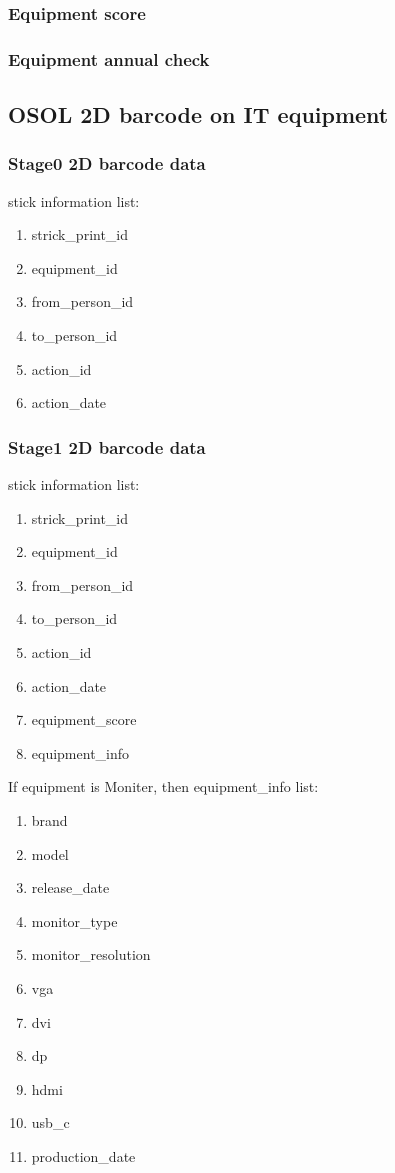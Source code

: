 \documentclass[a4paper,11pt]{article}
\begin{document}
\subsubsection{Equipment score}

\subsubsection{Equipment annual check}

\subsection{OSOL 2D barcode  on IT equipment}

\subsubsection {Stage0 2D barcode data}
stick information list:
\begin{enumerate}
	\item strick\_print\_id
	\item equipment\_id
	\item from\_person\_id
	\item to\_person\_id
	\item action\_id
	\item action\_date
\end{enumerate}

\subsubsection {Stage1 2D barcode data}
stick information list:
\begin{enumerate}
	\item strick\_print\_id
	\item equipment\_id
	\item from\_person\_id
	\item to\_person\_id
	\item action\_id
	\item action\_date
	\item equipment\_score
	\item equipment\_info
\end{enumerate}

If equipment is Moniter, then equipment\_info list:
\begin{enumerate}
	\item brand
	\item model
	\item release\_date
	\item monitor\_type
	\item monitor\_resolution
	\item vga
	\item dvi
	\item dp
	\item hdmi
	\item usb\_c
	\item production\_date
\end{enumerate}
\end{document}
